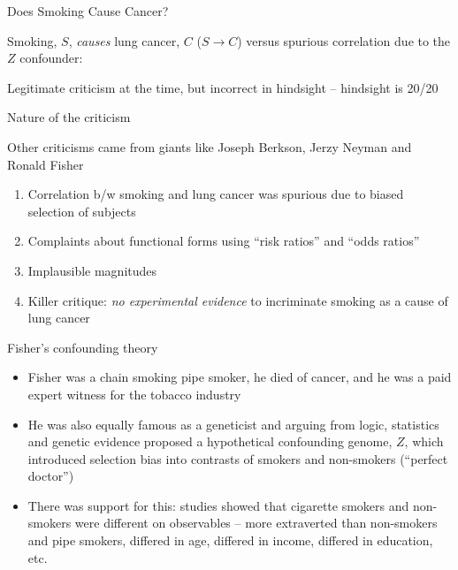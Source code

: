 \documentclass{beamer}
\begin{document}
	
\begin{frame}{Does Smoking Cause Cancer?}
	
  Smoking, $S$, \emph{causes} lung cancer, $C$ ($S \rightarrow C$) versus spurious correlation due to the $Z$ confounder:

  \begin{center}
  \end{center}

Legitimate criticism at the time, but incorrect in hindsight -- hindsight is 20/20
	
\end{frame}


\begin{frame}{Nature of the criticism}

Other criticisms came from giants like Joseph Berkson, Jerzy Neyman and Ronald Fisher
		\begin{enumerate}
		\item Correlation b/w smoking and lung cancer was spurious due to biased selection of subjects
		\item Complaints about functional forms using ``risk ratios'' and ``odds ratios''
		\item Implausible magnitudes
		\item Killer critique: \emph{no experimental evidence} to incriminate smoking as a cause of lung cancer
		\end{enumerate}
\end{frame}

\begin{frame}{Fisher's confounding theory}
		\begin{itemize}
		\item  Fisher was a chain smoking pipe smoker, he died of cancer, and he was a paid expert witness for the tobacco industry
		\item He was also equally famous as a geneticist and arguing from logic, statistics and genetic evidence proposed a hypothetical confounding genome, $Z$, which introduced selection bias into contrasts of smokers and non-smokers (``perfect doctor'')
		\item There was support for this:  studies showed that cigarette smokers and non-smokers were different on observables -- more extraverted than non-smokers and pipe smokers, differed in age, differed in income, differed in education, etc.
		\end{itemize}
\end{frame}
\end{document}
